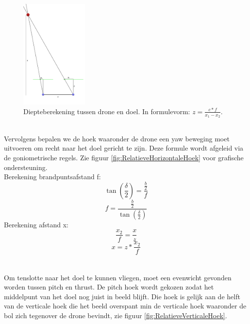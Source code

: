 \begin{figure}[h]
	\centering
	\includegraphics[width=0.3\textwidth]{DiepteberekeningDroneEnDoel.png}
	\caption{Diepteberekening tussen drone en doel. In formulevorm: \(z = \frac{c * f}{x_1 - x_2}\).}
	\label{fig:DiepteberekeningDroneEnDoel}
\end{figure}
\\
Vervolgens bepalen we de hoek waaronder de drone een yaw beweging moet uitvoeren om recht naar het doel gericht te zijn. Deze formule wordt afgeleid via de goniometrische regels. Zie figuur \ref{fig:RelatieveHorizontaleHoek} voor grafische ondersteuning. 
\\
Berekening brandpuntsafstand f:
\begin{equation} \label{eq:RelatieveVerticaleHoekBegin}
\tan(\frac{\delta}{2}) = \frac{\frac{b}{2}}{f}
\end{equation}
\begin{equation} 
f = \frac{\frac{b}{2}}{\tan(\frac{\delta}{2})}
\end{equation}
Berekening afstand x:
\begin{equation} 
\frac{x_2}{f} = \frac{x}{z}
\end{equation}
\begin{equation} \label{eq:RelatieveVerticaleHoekEind}
x = z * \frac{x_2}{f}	
\end{equation}
\\
\\
Om tenslotte naar het doel te kunnen vliegen, moet een evenwicht gevonden worden tussen pitch en thrust. De pitch hoek wordt gekozen zodat het middelpunt van het doel nog juist in beeld blijft. Die hoek is gelijk aan de helft van de verticale hoek die het beeld overspant min de verticale hoek waaronder de bol zich tegenover de drone bevindt, zie figuur \ref{fig:RelatieveVerticaleHoek}. 
\\
